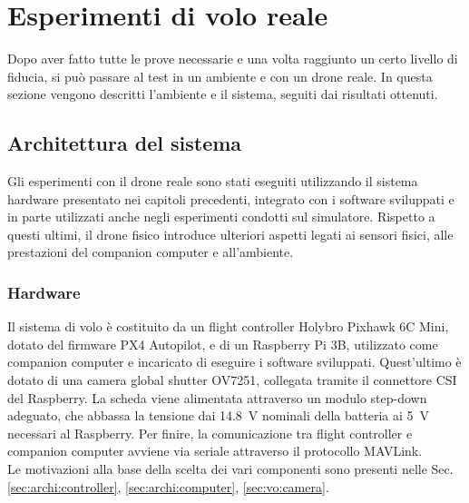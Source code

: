 \section{Esperimenti di volo reale}
Dopo aver fatto tutte le prove necessarie e una volta raggiunto un certo livello di fiducia, si può passare al test in un ambiente e con un drone reale. In questa sezione vengono descritti l'ambiente e il sistema, seguiti dai risultati ottenuti.

\subsection{Architettura del sistema}
Gli esperimenti con il drone reale sono stati eseguiti utilizzando il sistema hardware presentato nei capitoli precedenti, integrato con i software sviluppati e in parte utilizzati anche negli esperimenti condotti sul simulatore. Rispetto a questi ultimi, il drone fisico introduce ulteriori aspetti legati ai sensori fisici, alle prestazioni del companion computer e all'ambiente.
\subsubsection{Hardware}
Il sistema di volo è costituito da un flight controller Holybro Pixhawk 6C Mini, dotato del firmware PX4 Autopilot, e di un Raspberry Pi 3B, utilizzato come companion computer e incaricato di eseguire i software sviluppati. Quest'ultimo è dotato di una camera global shutter OV7251, collegata tramite il connettore CSI del Raspberry. La scheda viene alimentata attraverso un modulo step-down adeguato, che abbassa la tensione dai \SI{14,8}{\volt} nominali della batteria ai \SI{5}{\volt} necessari al Raspberry. Per finire, la comunicazione tra flight controller e companion computer avviene via seriale attraverso il protocollo MAVLink.\\
Le motivazioni alla base della scelta dei vari componenti sono presenti nelle Sec. \ref{sec:archi:controller}, \ref{sec:archi:computer}, \ref{sec:vo:camera}.
